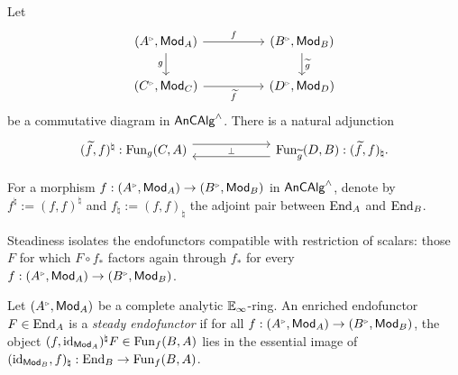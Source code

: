 \begin{proposition}\label{prop: endofunctor functoriality}
    Let 
    $$%
    \begin{tikzcd}
        {(A^{\tri},\Mod_{A})} && {(B^{\tri},\Mod_{B})} \\
        {(C^{\tri},\Mod_{C})} && {(D^{\tri},\Mod_{D})}
        \arrow["f", from=1-1, to=1-3]
        \arrow["g"', from=1-1, to=2-1]
        \arrow["{\widetilde{g}}", from=1-3, to=2-3]
        \arrow["{\widetilde{f}}"', from=2-1, to=2-3]
    \end{tikzcd}$$
    be a commutative diagram in $\mathsf{An}\mathsf{CAlg}^{\wedge}$. There is a natural adjunction 
    $$%
    \begin{tikzcd}
        {(\widetilde{f},f)^{\natural}:\Fun_{g}(C, A)} & \mperp & {\Fun_{\widetilde{g}}(D, B):(\widetilde{f},f)_{\natural}.}
        \arrow[shift left=2, from=1-1, to=1-3]
        \arrow[shift left=2, from=1-3, to=1-1]
    \end{tikzcd}$$
\end{proposition}
\begin{remark}\label{rmk: single endofunctors}
    For a morphism $f:(A^{\tri},\Mod_{A})\to (B^{\tri},\Mod_{B})$ in $\mathsf{An}\mathsf{CAlg}^{\wedge}$, denote by $f^{\natural}:=(f,f)^{\natural}$ and $f_{\natural}:=(f,f)_{\natural}$ the adjoint pair between $\mathrm{End}_{A}$ and $\mathrm{End}_{B}$. 
\end{remark}
Steadiness isolates the endofunctors compatible with restriction of scalars: those $F$ for which $F\circ f_{*}$ factors again through $f_{*}$ for every $f:(A^{\tri},\Mod_{A})\to(B^{\tri},\Mod_{B})$.
\begin{definition}\label{def: steady endofunctors}
    Let $(A^{\tri},\Mod_{A})$ be a complete analytic $\mathbb{E}_{\infty}$-ring. An enriched endofunctor $F\in\mathrm{End}_{A}$ is a \emph{steady endofunctor} if for all $f:(A^{\tri},\Mod_{A})\to(B^{\tri},\Mod_{B})$, the object $(f,\mathrm{id}_{\mathsf{Mod}_{A}})^{\natural}F\in\mathrm{Fun}_{f}(B, A)$ lies in the essential image of $(\mathrm{id}_{\mathsf{Mod}_{B}},f)_{\natural}:\mathrm{End}_{B}\to\mathrm{Fun}_{f}(B, A)$. 
\end{definition}
